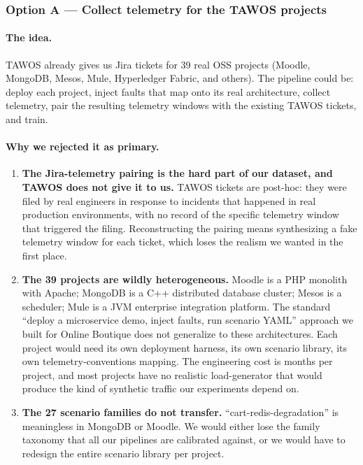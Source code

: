 \subsubsection{Option A --- Collect telemetry for the TAWOS projects}

\paragraph{The idea.} TAWOS already gives us Jira tickets for 39 real OSS projects (Moodle, MongoDB, Mesos, Mule, Hyperledger Fabric, and others). The pipeline could be: deploy each project, inject faults that map onto its real architecture, collect telemetry, pair the resulting telemetry windows with the existing TAWOS tickets, and train.

\paragraph{Why we rejected it as primary.}

\begin{enumerate}
\item \textbf{The Jira-telemetry pairing is the hard part of our dataset, and TAWOS does not give it to us.} TAWOS tickets are post-hoc: they were filed by real engineers in response to incidents that happened in real production environments, with no record of the specific telemetry window that triggered the filing. Reconstructing the pairing means synthesizing a fake telemetry window for each ticket, which loses the realism we wanted in the first place.
\item \textbf{The 39 projects are wildly heterogeneous.} Moodle is a PHP monolith with Apache; MongoDB is a C++ distributed database cluster; Mesos is a scheduler; Mule is a JVM enterprise integration platform. The standard ``deploy a microservice demo, inject faults, run scenario YAML'' approach we built for Online Boutique does not generalize to these architectures. Each project would need its own deployment harness, its own scenario library, its own telemetry-conventions mapping. The engineering cost is months per project, and most projects have no realistic load-generator that would produce the kind of synthetic traffic our experiments depend on.
\item \textbf{The 27 scenario families do not transfer.} ``cart-redis-degradation'' is meaningless in MongoDB or Moodle. We would either lose the family taxonomy that all our pipelines are calibrated against, or we would have to redesign the entire scenario library per project.
\end{enumerate}

